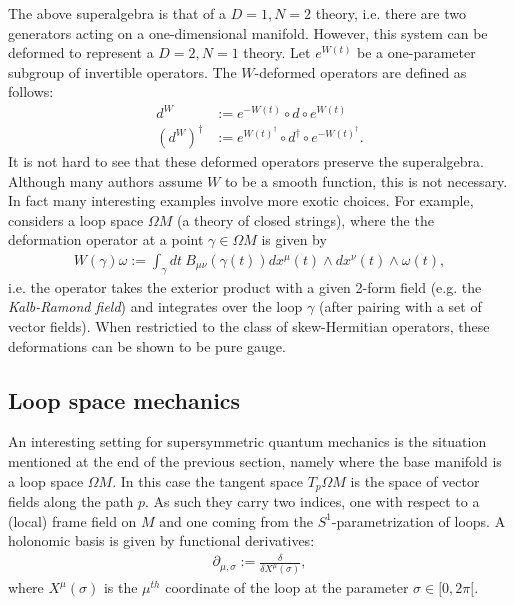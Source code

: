     The above superalgebra is that of a $D=1,N=2$ theory, i.e. there are two generators acting on a one-dimensional manifold. However, this system can be deformed to represent a $D=2,N=1$ theory. Let $e^{W(t)}$ be a one-parameter subgroup of invertible operators. The $W$-deformed operators are defined as follows:
    \begin{align}
        d^W &:= e^{-W(t)}\circ d\circ e^{W(t)}\\
        (d^W)^\dagger &:= e^{W(t)^\dagger}\circ d^\dagger\circ e^{-W(t)^\dagger}.
    \end{align}
    It is not hard to see that these deformed operators preserve the superalgebra. Although many authors assume $W$ to be a smooth function, this is not necessary. In fact many interesting examples involve more exotic choices. For example, \cite{phd_schreiber} considers a loop space $\Omega M$ (a theory of closed strings), where the the deformation operator at a point $\gamma\in\Omega M$ is given by
    \begin{gather}
        W(\gamma)\omega := \int_\gamma dt\ B_{\mu\nu}(\gamma(t))dx^\mu(t)\wedge dx^\nu(t)\wedge\omega(t),
    \end{gather}
    i.e. the operator takes the exterior product with a given 2-form field (e.g. the \textit{Kalb-Ramond field}) and integrates over the loop $\gamma$ (after pairing with a set of vector fields). When restrictied to the class of skew-Hermitian operators, these deformations can be shown to be pure gauge.

\subsection{Loop space mechanics}

    An interesting setting for supersymmetric quantum mechanics is the situation mentioned at the end of the previous section, namely where the base manifold is a loop space $\Omega M$. In this case the tangent space $T_p\Omega M$ is the space of vector fields along the path $p$. As such they carry two indices, one with respect to a (local) frame field on $M$ and one coming from the $S^1$-parametrization of loops. A holonomic basis is given by functional derivatives:
    \begin{gather}
        \partial_{\mu,\sigma} := \frac{\delta}{\delta X^\mu(\sigma)},
    \end{gather}
    where $X^\mu(\sigma)$ is the $\mu^{th}$ coordinate of the loop at the parameter $\sigma\in[0,2\pi[$.



